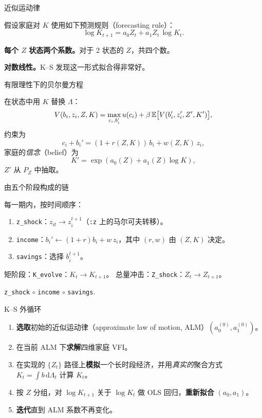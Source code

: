 \documentclass[10pt,aspectratio=169]{beamer}
\begin{document}
\begin{frame}{近似运动律}

假设家庭对 $K$ 使用如下预测规则（forecasting rule）：
\[
  \log K_{t+1} = a_0 Z_t + a_1 Z_t\, \log K_t.
\]

\textbf{每个 $Z$ 状态两个系数。}对于 2 状态的 $Z$，共四个数。

\textbf{对数线性。}K--S 发现这一形式拟合得非常好。

\end{frame}

\begin{frame}{有限理性下的贝尔曼方程}

在状态中用 $K$ 替换 $\Lambda$：
\[
  V(b_i, z_i, Z, K) = \max_{c_i, b_i'} u(c_i) + \beta\, \mathbb{E}\bigl[V(b_i', z_i', Z', K')\bigr],
\]
约束为
\[
  c_i + b_i' = (1 + r(Z, K))\, b_i + w(Z, K)\, z_i,
\]
家庭的\emph{信念}（belief）为
\[
  K' = \exp(a_0(Z) + a_1(Z) \log K),
\]
$Z'$ 从 $P_Z$ 中抽取。

\end{frame}

\begin{frame}{由五个阶段构成的链}

每一期内，按时间顺序：
\begin{enumerate}
  \item \texttt{z\_shock}：$z_{it} \to z_i^{t+1}$（\texttt{:z} 上的马尔可夫转移）。
  \item \texttt{income}：$b_i' \gets (1+r) b_i + w\, z_i$，其中 $(r, w)$ 由 $(Z, K)$ 决定。
  \item \texttt{savings}：选择 $b_i^{t+1}$。
\end{enumerate}
矩阶段：\texttt{K\_evolve}：$K_t \to K_{t+1}$。
总量冲击：\texttt{Z\_shock}：$Z_t \to Z_{t+1}$。

\smallskip
\begin{center}\small
\texttt{z\_shock} $\circ$ \texttt{income} $\circ$ \texttt{savings}.
\end{center}
\end{frame}

\begin{frame}{K--S 外循环}

\begin{enumerate}
  \item \textbf{选取}初始的近似运动律（approximate law of motion, ALM）$(a_0^{(0)}, a_1^{(0)})$。
  \item 在当前 ALM 下\textbf{求解}四维家庭 VFI。
  \item 在实现的 $\{Z_t\}$ 路径上\textbf{模拟}一个长时段经济，并用\emph{真实的}聚合方式 $K_t = \int b\, \mathrm d\Lambda_t$ 计算 $K_t$。
  \item 按 $Z$ 分组，对 $\log K_{t+1}$ 关于 $\log K_t$ 做 OLS 回归，\textbf{重新拟合} $(a_0, a_1)$。
  \item \textbf{迭代}直到 ALM 系数不再变化。
\end{enumerate}

\end{frame}
\end{document}
